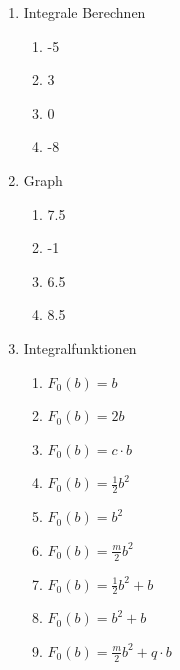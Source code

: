\begin{enumerate}
	\item Integrale Berechnen
	      \begin{enumerate}
		      \item -5
		      \item 3
		      \item 0
		      \item -8
	      \end{enumerate}
	\item Graph
	      \begin{enumerate}
		      \item 7.5
		      \item -1
		      \item 6.5
		      \item 8.5
	      \end{enumerate}
	\item Integralfunktionen
	      \begin{enumerate}
		      \item $F_0(b) = b$
		      \item $F_0(b) = 2b$
		      \item $F_0(b) = c\cdot b$
		      \item $F_0(b) = \frac{1}{2} b^2$
		      \item $F_0(b) = b^2$
		      \item $F_0(b) = \frac{m}{2} b^2$
		      \item $F_0(b) = \frac{1}{2} b^2 + b$
		      \item $F_0(b) = b^2 + b$
		      \item $F_0(b) = \frac{m}{2} b^2 + q\cdot b$
	      \end{enumerate}
\end{enumerate}
